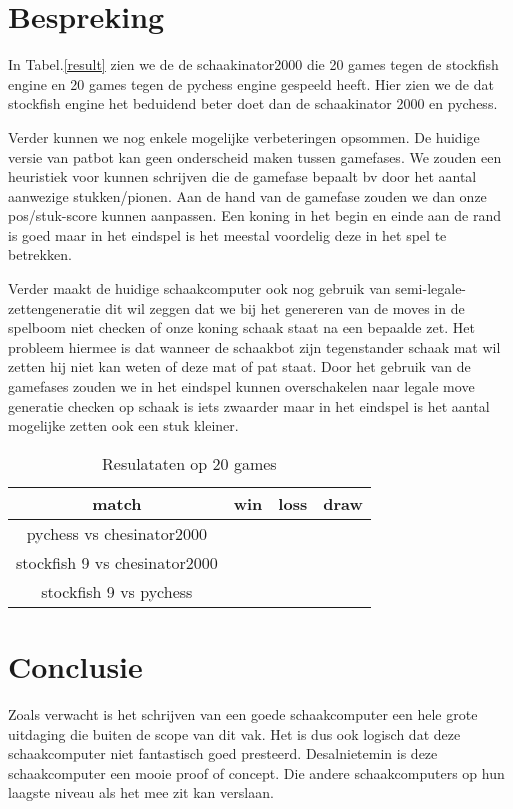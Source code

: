 \documentclass[twoside,twocolumn]{article}
\begin{document}
\section{Bespreking} 
In Tabel.\ref{result} zien we de de schaakinator2000 die 20 games tegen de stockfish engine en 20 games tegen de pychess engine gespeeld heeft.
Hier zien we de dat stockfish engine het beduidend beter doet dan de schaakinator 2000 en pychess. 

Verder kunnen we nog enkele mogelijke verbeteringen opsommen.
De huidige versie van patbot kan geen onderscheid maken tussen gamefases.
We zouden een heuristiek voor kunnen schrijven die de gamefase bepaalt bv door het aantal aanwezige stukken/pionen.
Aan de hand van  de gamefase zouden we dan onze pos/stuk-score kunnen aanpassen.
Een koning in het begin en einde aan de rand is goed maar in het eindspel is het meestal voordelig deze in het spel te betrekken.

Verder maakt de huidige schaakcomputer ook nog gebruik van semi-legale-zettengeneratie dit wil zeggen dat we bij het genereren van de moves in de spelboom niet checken of onze koning schaak staat na een bepaalde zet. Het probleem hiermee is dat wanneer de schaakbot zijn tegenstander schaak mat wil zetten hij niet kan weten of deze mat of pat staat.
Door het gebruik van de gamefases zouden we in het eindspel kunnen overschakelen naar legale move generatie checken op schaak is iets zwaarder maar in het eindspel is het aantal mogelijke zetten ook een stuk kleiner.
\begin{table}[H]
    \caption{Resulataten op 20 games}
    \label{tab:result}

    \begin{center}
        \begin{tabular}{|c|c|c|c|}
            \hline
           match & win & loss & draw \\
           \hline
           pychess vs chesinator2000  & \\
            \hline
           stockfish 9 vs chesinator2000  & \\
           \hline
           stockfish 9 vs pychess &\\
            \hline
        \end{tabular}
    \end{center}
\end{table}


\section{Conclusie}
Zoals verwacht is het schrijven van een goede schaakcomputer een hele grote uitdaging die buiten de scope van dit vak.
Het is dus ook logisch dat deze schaakcomputer niet fantastisch goed presteerd.
Desalnietemin is deze schaakcomputer een mooie proof of concept. 
Die andere schaakcomputers op hun laagste niveau als het mee zit kan verslaan.
\end{document}
